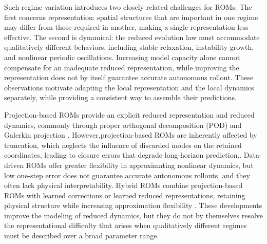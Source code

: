 \documentclass{article}
\begin{document}
Such regime variation introduces two closely related challenges for ROMs. The first concerns representation: spatial structures that are important in one regime may differ from those required in another, making a single representation less effective. The second is dynamical: the reduced evolution law must accommodate qualitatively different behaviors, including stable relaxation, instability growth, and nonlinear periodic oscillations. Increasing model capacity alone cannot compensate for an inadequate reduced representation, while improving the representation does not by itself guarantee accurate autonomous rollout. These observations motivate adapting the local representation and the local dynamics separately, while providing a consistent way to assemble their predictions.




Projection-based ROMs provide an explicit reduced representation and reduced dynamics, commonly through proper orthogonal decomposition (POD) and Galerkin projection \citep{sirovich1987,berkooz1993,benner2015}. However,projection-based ROMs are inherently affected by truncation, which neglects the influence of discarded modes on the retained coordinates, leading to closure errors that degrade long-horizon prediction.\citep{amsallem2012}. Data-driven ROMs offer greater flexibility in approximating nonlinear dynamics, but low one-step error does not guarantee accurate autonomous rollouts, and they often lack physical interpretability\citep{duraisamy2019,brunton2020}. Hybrid ROMs combine projection-based ROMs with learned corrections or learned reduced representations, retaining physical structure while increasing approximation flexibility
\citep{dar2023,lee2020,fresca2022,geelen2023}. These developments improve the modeling of reduced dynamics, but they do not by themselves resolve the representational difficulty that arises when qualitatively different regimes must be described over a broad parameter range.
\end{document}
